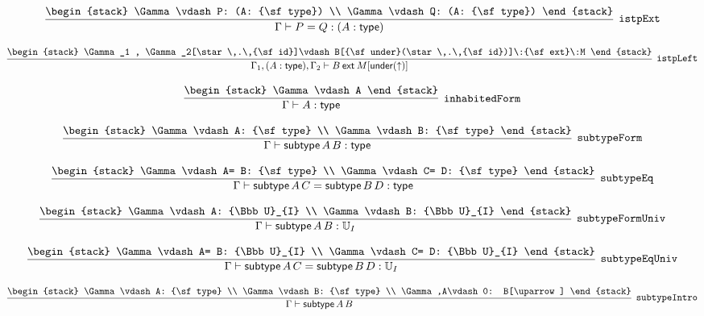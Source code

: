\[
\infer[{\tt istpExt}]{\Gamma \vdash P= Q: (A: {\sf type})}{
\begin{stack}
\Gamma \vdash P: (A: {\sf type})
\\
\Gamma \vdash Q: (A: {\sf type})
\end{stack}}
\]

\[
\infer[{\tt istpLeft}]{\Gamma_1 ,(A: {\sf type}), \Gamma_2 \vdash B\:{\sf ext}\:M[{\sf under}(\uparrow )]}{
\begin{stack}
\Gamma_1 , \Gamma_2[\star \,.\,{\sf id}]\vdash B[{\sf under}(\star \,.\,{\sf id})]\:{\sf ext}\:M
\end{stack}}
\]

\[
\infer[{\tt inhabitedForm}]{\Gamma \vdash A: {\sf type}}{
\begin{stack}
\Gamma \vdash A
\end{stack}}
\]

\[
\infer[{\tt subtypeForm}]{\Gamma \vdash {\sf subtype}\,A\,B: {\sf type}}{
\begin{stack}
\Gamma \vdash A: {\sf type}
\\
\Gamma \vdash B: {\sf type}
\end{stack}}
\]

\[
\infer[{\tt subtypeEq}]{\Gamma \vdash {\sf subtype}\,A\,C= {\sf subtype}\,B\,D: {\sf type}}{
\begin{stack}
\Gamma \vdash A= B: {\sf type}
\\
\Gamma \vdash C= D: {\sf type}
\end{stack}}
\]

\[
\infer[{\tt subtypeFormUniv}]{\Gamma \vdash {\sf subtype}\,A\,B: {\Bbb U}_{I}}{
\begin{stack}
\Gamma \vdash A: {\Bbb U}_{I}
\\
\Gamma \vdash B: {\Bbb U}_{I}
\end{stack}}
\]

\[
\infer[{\tt subtypeEqUniv}]{\Gamma \vdash {\sf subtype}\,A\,C= {\sf subtype}\,B\,D: {\Bbb U}_{I}}{
\begin{stack}
\Gamma \vdash A= B: {\Bbb U}_{I}
\\
\Gamma \vdash C= D: {\Bbb U}_{I}
\end{stack}}
\]

\[
\infer[{\tt subtypeIntro}]{\Gamma \vdash {\sf subtype}\,A\,B}{
\begin{stack}
\Gamma \vdash A: {\sf type}
\\
\Gamma \vdash B: {\sf type}
\\
\Gamma ,A\vdash 0: B[\uparrow ]
\end{stack}}
\]

